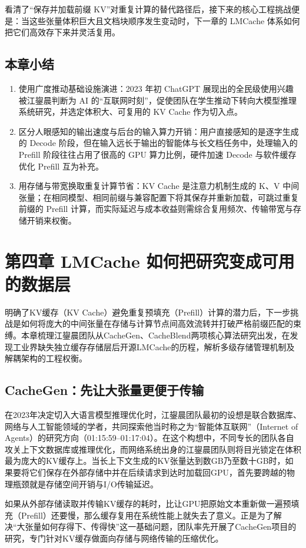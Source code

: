 \documentclass[UTF8,a4paper,11pt,fontset=fandol]{ctexart}
\begin{document}
看清了“保存并加载前缀 KV”对重复计算的替代路径后，接下来的核心工程挑战便是：当这些张量体积巨大且文档块顺序发生变动时，下一章的 LMCache 体系如何把它们高效存下来并灵活复用。
\subsection{本章小结}
\begin{enumerate}
\item 使用广度推动基础设施演进：2023 年初 ChatGPT 展现出的全民级使用兴趣被江鋆晨判断为 AI 的“互联网时刻”，促使团队在学生推动下转向大模型推理系统研究，并选定体积大、可复用的 KV Cache 作为切入点。
\item 区分人眼感知的输出速度与后台的输入算力开销：用户直接感知的是逐字生成的 Decode 阶段，但在输入远长于输出的智能体与长文档任务中，处理输入的 Prefill 阶段往往占用了很高的 GPU 算力比例，硬件加速 Decode 与软件缓存优化 Prefill 互为补充。
\item 用存储与带宽换取重复计算节省：KV Cache 是注意力机制生成的 K、V 中间张量；在相同模型、相同前缀与兼容配置下将其保存并重新加载，可跳过重复前缀的 Prefill 计算，而实际延迟与成本收益则需综合复用频次、传输带宽与存储开销来权衡。
\end{enumerate}
\section{第四章 LMCache 如何把研究变成可用的数据层}
明确了KV缓存（KV Cache）避免重复预填充（Prefill）计算的潜力后，下一步挑战是如何将庞大的中间张量在存储与计算节点间高效流转并打破严格前缀匹配的束缚。本章梳理江鋆晨团队从CacheGen、CacheBlend两项核心算法研究出发，在发现工业界缺失独立缓存存储层后开源LMCache的历程，解析多级存储管理机制及解耦架构的工程权衡。
\subsection{CacheGen：先让大张量更便于传输}
在2023年决定切入大语言模型推理优化时，江鋆晨团队最初的设想是联合数据库、网络与人工智能领域的学者，共同探索他当时称之为“智能体互联网”（Internet of Agents）的研究方向（01:15:59–01:17:04）。在这个构想中，不同专长的团队各自攻关上下文数据库或推理优化，而网络系统出身的江鋆晨团队则将目光锁定在体积最为庞大的KV缓存上。当长上下文生成的KV张量达到数GB乃至数十GB时，如果要将它们保存在外部存储中并在后续请求到达时加载回GPU，首先要跨越的物理瓶颈就是存储空间开销与I/O传输延迟。

如果从外部存储读取并传输KV缓存的耗时，比让GPU把原始文本重新做一遍预填充（Prefill）还要慢，那么缓存复用在系统性能上就失去了意义。正是为了解决“大张量如何存得下、传得快”这一基础问题，团队率先开展了CacheGen项目的研究，专门针对KV缓存做面向存储与网络传输的压缩优化。
\end{document}
